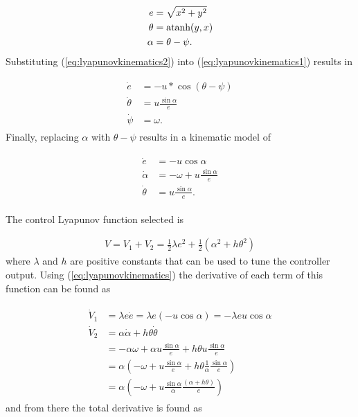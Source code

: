 \begin{align}
\label{eq:lyapunovkinematics2}
\begin{split}
e &= \sqrt{x^2+y^2} \\
\theta &= \mathop{\text{atanh}}(y,x) \\
\alpha &= \theta - \psi.
\end{split}
\end{align}
Substituting (\ref{eq:lyapunovkinematics2}) into (\ref{eq:lyapunovkinematics1}) results in

\begin{align}
\label{eq:lyapunovkinematics3}
\begin{split}
\dot{e} &= -u*\cos(\theta-\psi) \\
\dot{\theta} &= u\frac{\sin\alpha}{e} \\
\dot{\psi} &= \omega.
\end{split}
\end{align}
Finally, replacing $\alpha$ with $\theta-\psi$ results in a kinematic model of

\begin{align}
\label{eq:lyapunovkinematics}
\begin{split}
\dot{e} &= -u\cos\alpha \\
\dot{\alpha} &= -\omega + u\frac{\sin\alpha}{e} \\
\dot{\theta} &= u\frac{\sin\alpha}{e}.
\end{split}
\end{align}

The control Lyapunov function selected is

\begin{align}
\label{eq:lyapunovfunction}
V = V_1 + V_2 = \frac{1}{2}\lambda e^2 + \frac{1}{2}\left(\alpha^2+h\theta^2\right)
\end{align}
where $\lambda$ and $h$ are positive constants that can be used to tune the controller output. Using (\ref{eq:lyapunovkinematics}) the derivative of each term of this function can be found as

\begin{align}
\label{eq:Vderivatives}
\begin{split}
\dot{V}_1 &= \lambda e\dot{e} = \lambda e (-u\cos\alpha) = -\lambda eu\cos\alpha \\
\dot{V}_2 &= \alpha\dot{\alpha}+h\theta\dot{\theta} \\
&= -\alpha\omega + \alpha u\frac{\sin\alpha}{e} + h\theta u\frac{\sin\alpha}{e} \\
&= \alpha\left(-\omega + u\frac{\sin\alpha}{e} + h\theta\frac{1}{\alpha}\frac{\sin\alpha}{e}\right) \\
&= \alpha\left(-\omega + u\frac{\sin\alpha}{\alpha}\frac{(\alpha+h\theta)}{e}\right)
\end{split}
\end{align}
and from there the total derivative is found as

